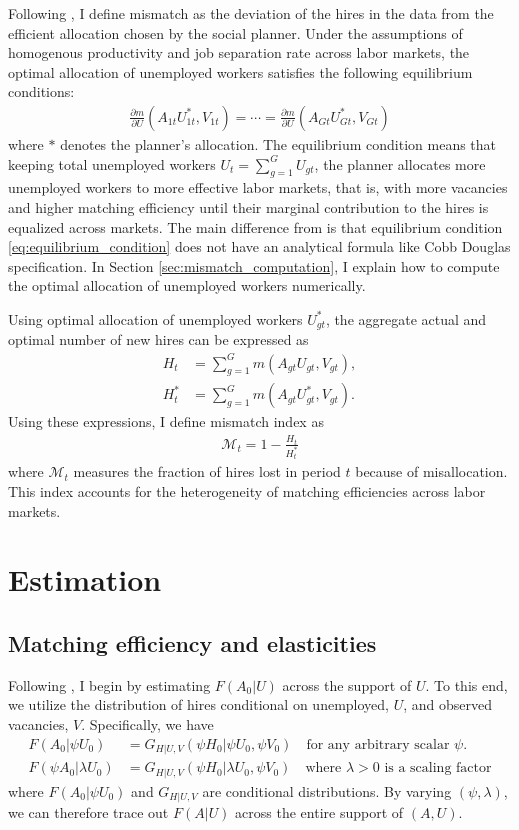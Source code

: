 \documentclass[12pt]{article}
\begin{document}
Following \cite{csahin2014mismatch}, I define mismatch as the deviation of the hires in the data from the efficient allocation chosen by the social planner.
Under the assumptions of homogenous productivity and job separation rate across labor markets, the optimal allocation of unemployed workers satisfies the following equilibrium conditions:
\begin{align}
    \frac{\partial m}{\partial U}\left(A_{1t}U_{1t}^{*},V_{1t}\right)=\cdots=\frac{\partial m}{\partial U}\left(A_{Gt}U_{Gt}^{*},V_{Gt}\right) \label{eq:equilibrium_condition}
\end{align}
where $*$ denotes the planner's allocation.
The equilibrium condition means that keeping total unemployed workers $U_{t}=\sum_{g=1}^{G}U_{gt}$, the planner allocates more unemployed workers to more effective labor markets, that is, with more vacancies and higher matching efficiency until their marginal contribution to the hires is equalized across markets.
The main difference from \cite{csahin2014mismatch} is that equilibrium condition \eqref{eq:equilibrium_condition} does not have an analytical formula like Cobb Douglas specification.
In Section \ref{sec:mismatch_computation}, I explain how to compute the optimal allocation of unemployed workers numerically.

Using optimal allocation of unemployed workers $U_{gt}^{*}$, the aggregate actual and optimal number of new hires can be expressed as
\begin{align*}
    H_{t}&=\sum_{g=1}^{G}m(A_{gt}U_{gt},V_{gt}),\\
    H_{t}^{*}&=\sum_{g=1}^{G}m(A_{gt}U_{gt}^{*},V_{gt}).
\end{align*}
Using these expressions, I define mismatch index as 
\begin{align}
    \mathcal{M}_{t}=1-\frac{H_{t}}{H_{t}^{*}}
\end{align}
where $\mathcal{M}_{t}$ measures the fraction of hires lost in period $t$ because of misallocation.
This index accounts for the heterogeneity of
matching efficiencies across labor markets.

\section{Estimation}
\subsection{Matching efficiency and elasticities}
Following \cite{lange2020beyond}, I begin by estimating $F(A_0|U)$ across the support of $U$. To this end, we utilize the distribution of hires conditional on unemployed, $U$, and observed vacancies, $V$. 
Specifically, we have
\begin{align*}
    F(A_0|\psi U_0) &= G_{H|U,V}(\psi H_0|\psi U_0, \psi V_0) \quad \text{for any arbitrary scalar } \psi.\\
    F(\psi A_0|\lambda U_0) &= G_{H|U,V}(\psi H_0|\lambda U_0, \psi V_0) \quad \text{where } \lambda > 0 \text{ is a scaling factor}
\end{align*}
where $F(A_0|\psi U_0)$ and $ G_{H|U,V}$ are conditional distributions.
By varying $(\psi, \lambda)$, we can therefore trace out $F(A|U)$ across the entire support of $(A, U)$.
\end{document}
